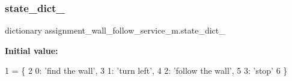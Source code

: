 \subsubsection{\texorpdfstring{state\+\_\+dict\+\_\+}{state\_dict\_}}
{\footnotesize\ttfamily dictionary assignment\+\_\+wall\+\_\+follow\+\_\+service\+\_\+m.\+state\+\_\+dict\+\_\+}

{\bfseries Initial value\+:}
\begin{DoxyCode}
1 =  \{
2     0: \textcolor{stringliteral}{'find the wall'},
3     1: \textcolor{stringliteral}{'turn left'},
4     2: \textcolor{stringliteral}{'follow the wall'},
5     3: \textcolor{stringliteral}{'stop'}
6 \}
\end{DoxyCode}

